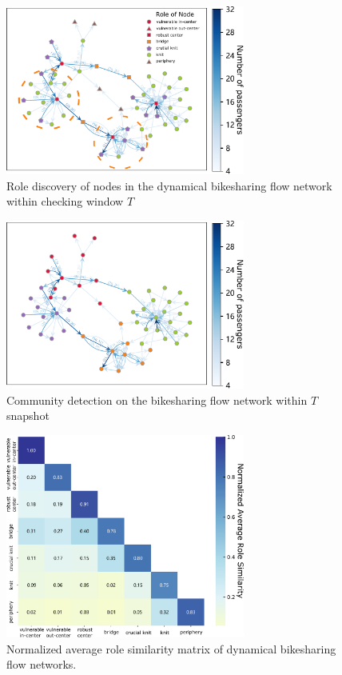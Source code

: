 \documentclass[a4paper,fleqn]{cas-sc}
\begin{document}
\begin{figure}[!htb]
  \centering
  \includegraphics[width=0.7\textwidth]{figs/role_bikesharing.pdf}
  \caption{Role discovery of nodes in the dynamical bikesharing flow network within checking window $T$}\label{fig:role_bikesharing}
\end{figure}

\begin{figure}[!htb]
  \centering
  \includegraphics[width=0.7\textwidth]{figs/graph_clustering.pdf}
  \caption{Community detection on the bikesharing flow network within $T$ snapshot}\label{fig:graph_clustering}
\end{figure}

\begin{figure}[!htb]
  \centering
  \includegraphics[width=0.7\textwidth]{figs/bikesharing_role_similarity.pdf}
  \caption{Normalized average role similarity matrix of dynamical bikesharing flow networks.}\label{fig:bikesharing_role_similarity}
\end{figure}
\end{document}
